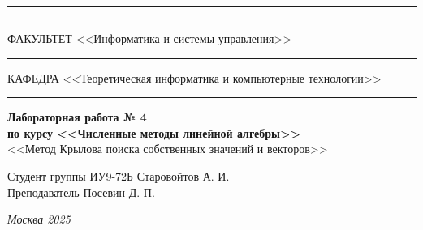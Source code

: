 \documentclass[a4paper, 14pt]{extarticle}
\begin{document}
\begin{titlepage}
\vspace{-25pt}
\hspace{-35pt}\rule{\textwidth}{2.3pt}

\vspace*{-20.3pt}
\hspace{-35pt}\rule{\textwidth}{0.4pt}

\vspace{1.5ex}
\hspace{-35pt} \noindent \small ФАКУЛЬТЕТ\hspace{80pt} <<Информатика и системы управления>>

\vspace*{-16pt}
\hspace{47pt}\rule{0.83\textwidth}{0.4pt}

\vspace{0.5ex}
\hspace{-35pt} \noindent \small КАФЕДРА\hspace{50pt} <<Теоретическая информатика и компьютерные технологии>>

\vspace*{-16pt}
\hspace{30pt}\rule{0.866\textwidth}{0.4pt}

\vspace{11em}

\begin{center}
\Large {\bf Лабораторная работа № 4} \\
\large {\bf по курсу <<Численные методы линейной алгебры>>} \\
\large <<Метод Крылова поиска собственных значений и векторов>>
\end{center}\normalsize

\vspace{8em}


\begin{flushright}
  {Студент группы ИУ9-72Б Старовойтов А. И. \hspace*{15pt}\\
  \vspace{2ex}
  Преподаватель Посевин Д. П.\hspace*{15pt}}
\end{flushright}

\bigskip

\vfill


\begin{center}
\textsl{Москва 2025}
\end{center}
\end{titlepage}
\end{document}
